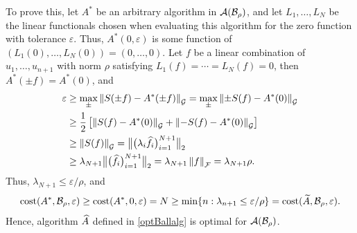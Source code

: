 \documentclass[final]{elsarticle}
\theoremstyle{definition}
\theoremstyle{remark}
\begin{document}
To prove this, let $A^*$ be an arbitrary algorithm in $\ca(\cb_{\rho})$, and let $L_1, \ldots, L_N$ be the linear functionals chosen when evaluating this algorithm for the zero function with tolerance $\varepsilon$.  Thus, $A^*(0,\varepsilon)$ is some function of $(L_1(0) , \ldots, L_N(0)) = (0, \ldots, 0)$.  Let $f$ be a linear combination of $u_1, \ldots, u_{n+1}$ with norm $\rho$ satisfying  $L_1(f) = \cdots = L_N(f) = 0$, then $A^*(\pm f) = A^*(0)$, and
\begin{align*}
\varepsilon & \ge \max_{\pm} \norm[\cg]{S(\pm f) - A^*(\pm f)} =  \max_{\pm} \norm[\cg]{\pm S( f) - A^*(0)} \\
& \ge \frac 12 \left [ \norm[\cg]{S( f) - A^*(0)} + \norm[\cg]{- S( f) - A^*(0)}\right] \\
& \ge \norm[\cg]{S(f)} 
= \bignorm[2]{\big(\lambda_i\hf_i\big)_{i=1}^{N+1}} \\
& \ge \lambda_{N+1} \bignorm[2]{\big(\hf_i\big)_{i=1}^{N+1}} = \lambda_{N+1} \norm[\cf]{f} = \lambda_{N+1} \rho.
\end{align*}
Thus, $\lambda_{N+1} \le \varepsilon/\rho$, and 
\[
\cost(A^*,\cb_\rho,\varepsilon) \ge \cost(A^*,0,\varepsilon)  = N \ge \min\{ n : \lambda_{n+1} \le \varepsilon/\rho \} = \cost(\tA,\cb_\rho,\varepsilon).
\]
Hence, algorithm $\hA$ defined in \eqref{optBallalg} is optimal for $\ca(\cb_{\rho})$.
\end{document}
